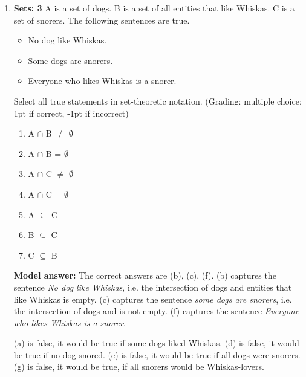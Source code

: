 \documentclass[a4,11pt]{article}
\begin{document}
\begin{enumerate}[leftmargin = 12pt]
{\bf Model answer:} The correct answer is left downward monotone. If \textit{All dogs love walks} is true, then it means that \textit{all chihuahuas love walks} is also true. Since chihuahuas is a subset of dogs, \textit{all} is left downward monotone. If \textit{All dogs love walks} is true, it does not entail that \textit{all dogs love walks in a park} is true. Some dogs might prefer walks in a city center. Therefore, \textit{all} is not right downward monotone.

\item {\bf Sets: 3}  A is a set of dogs. B is a set of all entities that like Whiskas. C is a set of snorers. The following sentences are true. 

\begin{itemize}[noitemsep]
\item No dog like Whiskas.
\item Some dogs are snorers.
\item Everyone who likes Whiskas is a snorer.
\end{itemize}

Select all true statements in set-theoretic notation. (Grading: multiple choice; 1pt if correct, -1pt if incorrect)

\begin{enumerate}
\item A $\cap$ B $\neq$ $\emptyset$
\item A $\cap$ B = $\emptyset$
\item A $\cap$ C $\neq$ $\emptyset$
\item A $\cap$ C = $\emptyset$
\item A $\subseteq$ C 
\item B $\subseteq$ C 
\item C $\subseteq$ B
\end{enumerate}

{\bf Model answer:} The correct answers are (b), (c), (f). (b) captures the sentence \textit{No dog like Whiskas}, i.e. the intersection of dogs and entities that like Whiskas is empty. (c) captures the sentence \textit{some dogs are snorers}, i.e. the intersection of dogs and is not empty. (f) captures the sentence \textit{Everyone who likes Whiskas is a snorer}.

(a) is false, it would be true if some dogs liked Whiskas. (d) is false, it would be true if no dog snored. (e) is false, it would be true if all dogs were snorers. (g) is false, it would be true, if all snorers would be Whiskas-lovers.



\end{enumerate}
\end{document}
